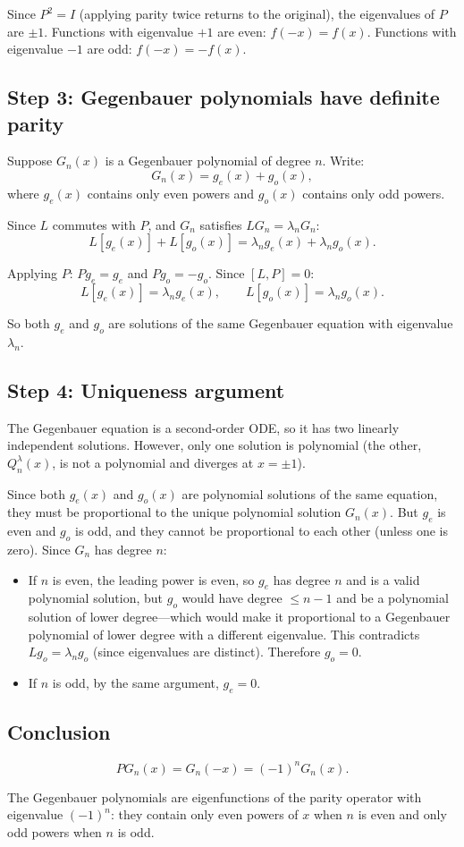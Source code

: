\documentclass[12pt]{article}
\begin{document}
Since $P^2 = I$ (applying parity twice returns to the original), the eigenvalues of $P$ are $\pm 1$. Functions with eigenvalue $+1$ are even: $f(-x) = f(x)$. Functions with eigenvalue $-1$ are odd: $f(-x) = -f(x)$.

\subsection*{Step 3: Gegenbauer polynomials have definite parity}

Suppose $G_n(x)$ is a Gegenbauer polynomial of degree $n$. Write:
\[
G_n(x) = g_e(x) + g_o(x),
\]
where $g_e(x)$ contains only even powers and $g_o(x)$ contains only odd powers.

Since $L$ commutes with $P$, and $G_n$ satisfies $LG_n = \lambda_n G_n$:
\[
L[g_e(x)] + L[g_o(x)] = \lambda_n g_e(x) + \lambda_n g_o(x).
\]

Applying $P$: $Pg_e = g_e$ and $Pg_o = -g_o$. Since $[L, P] = 0$:
\[
L[g_e(x)] = \lambda_n g_e(x), \qquad L[g_o(x)] = \lambda_n g_o(x).
\]

So both $g_e$ and $g_o$ are solutions of the same Gegenbauer equation with eigenvalue $\lambda_n$.

\subsection*{Step 4: Uniqueness argument}

The Gegenbauer equation is a second-order ODE, so it has two linearly independent solutions. However, only one solution is polynomial (the other, $Q_n^\lambda(x)$, is not a polynomial and diverges at $x = \pm 1$).

Since both $g_e(x)$ and $g_o(x)$ are polynomial solutions of the same equation, they must be proportional to the unique polynomial solution $G_n(x)$. But $g_e$ is even and $g_o$ is odd, and they cannot be proportional to each other (unless one is zero). Since $G_n$ has degree $n$:
\begin{itemize}
\item If $n$ is even, the leading power is even, so $g_e$ has degree $n$ and is a valid polynomial solution, but $g_o$ would have degree $\leq n-1$ and be a polynomial solution of lower degree---which would make it proportional to a Gegenbauer polynomial of lower degree with a different eigenvalue. This contradicts $Lg_o = \lambda_n g_o$ (since eigenvalues are distinct). Therefore $g_o = 0$.
\item If $n$ is odd, by the same argument, $g_e = 0$.
\end{itemize}

\subsection*{Conclusion}

\[
\boxed{PG_n(x) = G_n(-x) = (-1)^n G_n(x).}
\]

The Gegenbauer polynomials are eigenfunctions of the parity operator with eigenvalue $(-1)^n$: they contain only even powers of $x$ when $n$ is even and only odd powers when $n$ is odd.
\end{document}
